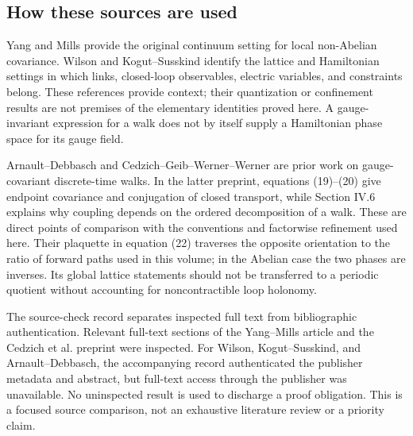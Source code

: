\subsection*{How these sources are used}
Yang and Mills provide the original continuum setting for local non-Abelian covariance. Wilson and Kogut--Susskind identify the lattice and Hamiltonian settings in which links, closed-loop observables, electric variables, and constraints belong. These references provide context; their quantization or confinement results are not premises of the elementary identities proved here. A gauge-invariant expression for a walk does not by itself supply a Hamiltonian phase space for its gauge field.

Arnault--Debbasch and Cedzich--Geib--Werner--Werner are prior work on gauge-covariant discrete-time walks. In the latter preprint, equations (19)--(20) give endpoint covariance and conjugation of closed transport, while Section IV.6 explains why coupling depends on the ordered decomposition of a walk. These are direct points of comparison with the conventions and factorwise refinement used here. Their plaquette in equation (22) traverses the opposite orientation to the ratio of forward paths used in this volume; in the Abelian case the two phases are inverses. Its global lattice statements should not be transferred to a periodic quotient without accounting for noncontractible loop holonomy.

The source-check record separates inspected full text from bibliographic authentication. Relevant full-text sections of the Yang--Mills article and the Cedzich et al. preprint were inspected. For Wilson, Kogut--Susskind, and Arnault--Debbasch, the accompanying record authenticated the publisher metadata and abstract, but full-text access through the publisher was unavailable. No uninspected result is used to discharge a proof obligation. This is a focused source comparison, not an exhaustive literature review or a priority claim.
